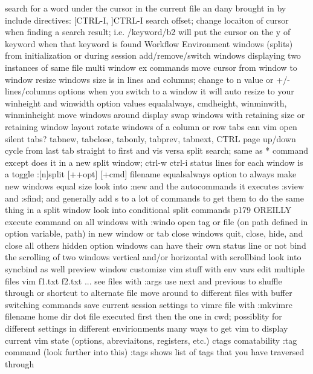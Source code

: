 \documentclass[12pt]{book}
\begin{document}
{  search for a word under the cursor in the current file an dany brought in by include directives: [CTRL-I, ]CTRL-I
  search offset; change locaiton of cursor when finding a search result; i.e. /keyword/b2 will put the cursor on the y of keyword when that keyword is found
Workflow
  Environment
    windows (splits)
      from initialization or during session
      add/remove/switch windows
      displaying two instances of same file
      multi window ex commands
      move cursor from window to window
      resize windows
        size is in lines and columns; change to n value or +/- lines/columns
        options
          when you switch to a window it will auto resize to your winheight and winwidth option values
          equalalways, cmdheight, winminwith, winminheight
      move windows around display
        swap windows with retaining size or retaining window layout
        rotate windows of a column or row
      tabs
        can vim open silent tabs?
        tabnew, tabclose, tabonly, tabprev, tabnext, CTRL page up/down
        cycle from last tab straight to first and vis versa
      split search; same as * command except does it in a new split window; ctrl-w ctrl-i
      status lines for each window is a toggle
      :[n]split [++opt] [+cmd] filename
      equalsalways option to always make new windows equal size
      look into :new and the autocommands it executes
      :sview and :sfind; and generally add s to a lot of commands to get them to do the same thing in a split window
      look into conditional split commands p179 OREILLY
      execute command on all windows with :windo
      open tag or file (on path defined in option variable, path) in new window or tab
      close windows
        quit, close, hide, and close all others
          hidden option
      windows can have their own status line or not
      bind the scrolling of two windows vertical and/or horizontal with scrollbind
        look into syncbind as well
      preview window
    customize vim stuff with env vars
    edit multiple files
      vim f1.txt f2.txt ...
      see files with :args
      use next and previous to shuffle through or shortcut to alternate file
    move around to different files with buffer switching commands
    save current session settings to vimrc file with :mkvimrc filename
  home dir dot file executed first then the one in cwd; possiblity for different settings in different envirionments
  many ways to get vim to display current vim state (options, abreviaitons, registers, etc.)
  ctags comatability
    :tag command (look further into this)
    :tags shows list of tags that you have traversed through
}
\end{document}
